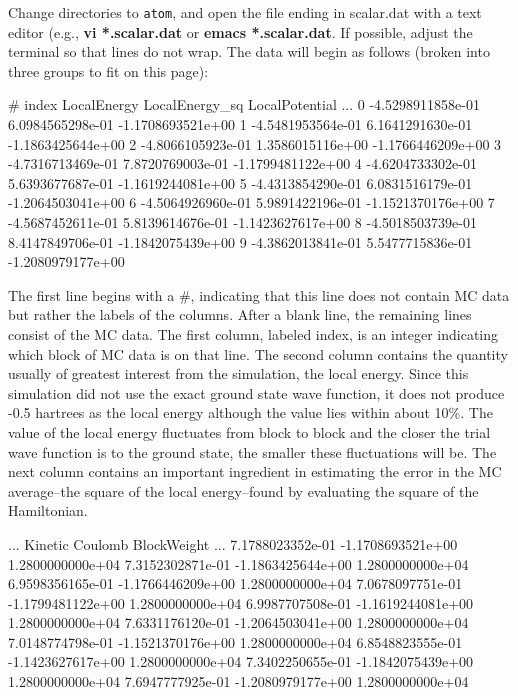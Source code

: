 Change directories to \texttt{atom}, and open the file ending in
scalar.dat with a text editor (e.g., \textbf{vi *.scalar.dat} or \textbf{emacs
*.scalar.dat}.  If possible, adjust the terminal so that lines do not wrap.
The data will begin as follows (broken into three groups to fit on this page):

\begin{shade}
#   index    LocalEnergy         LocalEnergy_sq      LocalPotential     ...
         0   -4.5298911858e-01    6.0984565298e-01   -1.1708693521e+00    
         1   -4.5481953564e-01    6.1641291630e-01   -1.1863425644e+00    
         2   -4.8066105923e-01    1.3586015116e+00   -1.1766446209e+00    
         3   -4.7316713469e-01    7.8720769003e-01   -1.1799481122e+00    
         4   -4.6204733302e-01    5.6393677687e-01   -1.1619244081e+00    
         5   -4.4313854290e-01    6.0831516179e-01   -1.2064503041e+00    
         6   -4.5064926960e-01    5.9891422196e-01   -1.1521370176e+00    
         7   -4.5687452611e-01    5.8139614676e-01   -1.1423627617e+00    
         8   -4.5018503739e-01    8.4147849706e-01   -1.1842075439e+00    
         9   -4.3862013841e-01    5.5477715836e-01   -1.2080979177e+00    
\end{shade}

The first line begins with a \#, indicating that this line does not contain MC
data but rather the labels of the columns.  After a blank line, the remaining
lines consist of the MC data.  The first column, labeled index, is an integer
indicating which block of MC data is on that line.  The second column contains
the quantity usually of greatest interest from the simulation, the local
energy.  Since this simulation did not use the exact ground state wave
function, it does not produce -0.5 hartrees as the local energy although the
value lies within about 10\%.  The value of the local energy fluctuates from
block to block and the closer the trial wave function is to the ground state,
the smaller these fluctuations will be.  The next column contains an important
ingredient in estimating the error in the MC average--the square of the local
energy--found by evaluating the square of the Hamiltonian.  

\begin{shade} 
...   Kinetic             Coulomb             BlockWeight        ... 
       7.1788023352e-01   -1.1708693521e+00    1.2800000000e+04   
       7.3152302871e-01   -1.1863425644e+00    1.2800000000e+04   
       6.9598356165e-01   -1.1766446209e+00    1.2800000000e+04   
       7.0678097751e-01   -1.1799481122e+00    1.2800000000e+04   
       6.9987707508e-01   -1.1619244081e+00    1.2800000000e+04   
       7.6331176120e-01   -1.2064503041e+00    1.2800000000e+04   
       7.0148774798e-01   -1.1521370176e+00    1.2800000000e+04   
       6.8548823555e-01   -1.1423627617e+00    1.2800000000e+04   
       7.3402250655e-01   -1.1842075439e+00    1.2800000000e+04   
       7.6947777925e-01   -1.2080979177e+00    1.2800000000e+04   
\end{shade}

